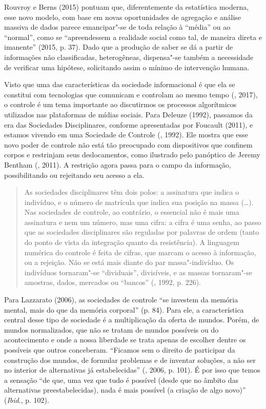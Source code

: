 Rouvroy e Berns (2015) pontuam que, diferentemente da estatística
moderna, esse novo modelo, com base em novas oportunidades de agregação
e análise massiva de dados parece emancipar"-se de toda relação à
``média'' ou ao ``normal'', como se ``apreendessem a realidade social
como tal, de maneira direta e imanente'' (2015, p. 37). Dado que a produção
de saber se dá a partir de informações não classificadas, heterogêneas,
dispensa"-se também a necessidade de verificar uma hipótese, solicitando
assim o mínimo de intervenção humana.

Visto que uma das características da sociedade informacional é que ela
se constitui com tecnologias que comunicam e controlam ao mesmo tempo
(, 2017), o controle é um tema importante ao discutirmos os
processos algorítmicos utilizados nas plataformas de mídias sociais.
Para Deleuze (1992), passamos da era das Sociedades Disciplinares,
conforme apresentadas por Foucault (2011), e estamos vivendo em uma Sociedade de Controle (, 1992). Ele mostra que esse novo poder de controle não está tão
preocupado com dispositivos que confinem corpos e restrinjam seus
deslocamentos, como ilustrado pelo panóptico de Jeremy Bentham (, 2011).
A restrição agora passa para o campo da informação, possibilitando ou rejeitando seu acesso a ela.

\begin{quote}
As sociedades disciplinares têm dois polos: a assinatura que indica o
indivíduo, e o número de matrícula que indica sua posição na massa
(\ldots{}). Nas sociedades de controle, ao contrário, o essencial não é mais
uma assinatura e nem um número, mas uma cifra: a cifra é uma senha, ao
passo que as sociedades disciplinares são reguladas por palavras de
ordem (tanto do ponto de vista da integração quanto da resistência). A
linguagem numérica do controle é feita de cifras, que marcam o acesso à
informação, ou a rejeição. Não se está mais diante do par
massa"-indivíduo. Os indivíduos tornaram"-se ``dividuais'', divisíveis, e
as massas tornaram"-se amostras, dados, mercados ou ``bancos'' (,
1992, p. 226).
\end{quote}

Para Lazzarato (2006), as sociedades de controle ``se investem da memória mental, mais do que
da memória corporal'' (p. 84). Para ele, a característica central desse
tipo de sociedade é a multiplicação da oferta de mundos. Porém, de
mundos normalizados, que não se tratam de mundos possíveis ou do
acontecimento e onde a nossa liberdade se trata apenas de escolher
dentre os possíveis que outros conceberam. ``Ficamos sem o direito de
participar da construção dos mundos, de formular problemas e de inventar
soluções, a não ser no interior de alternativas já estabelecidas''
(, 2006, p. 101).
É por isso que temos a sensação ``de que, uma vez que tudo é possível
(desde que no âmbito das alternativas preestabelecidas), nada é mais
possível (a criação de algo novo)'' (\emph{Ibid}., p. 102).

